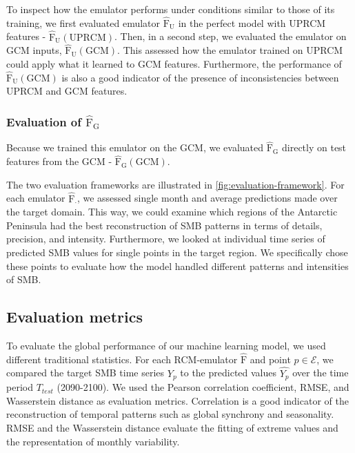 \documentclass[a4paper,11pt,oneside]{report}
\begin{document}
To inspect how the emulator performs under conditions similar to those of its training, we first evaluated emulator $\mathrm{\hat{F}_U}$ in the perfect model with UPRCM features - $\mathrm{\hat{F}_U(UPRCM)}$. Then, in a second step, we evaluated the emulator on GCM inputs, $\mathrm{\hat{F}_U(GCM)}$. This assessed how the emulator trained on UPRCM could apply what it learned to GCM features. Furthermore, the performance of $\mathrm{\hat{F}_U(GCM)}$ is also a good indicator of the presence of inconsistencies between UPRCM and GCM features. 

\subsubsection{Evaluation of $\mathrm{\hat{F}_G}$}
 Because we trained this emulator on the GCM, we evaluated $\mathrm{\hat{F}_G}$ directly on test features from the GCM - $\mathrm{\hat{F}_G(GCM)}$.

The two evaluation frameworks are illustrated in \autoref{fig:evaluation-framework}. For each emulator $\mathrm{\hat{F}_{\cdot}}$, we assessed single month and average predictions made over the target domain. This way, we could examine which regions of the Antarctic Peninsula had the best reconstruction of SMB patterns in terms of details, precision, and intensity. Furthermore, we looked at individual time series of predicted SMB values for single points in the target region. We specifically chose these points to evaluate how the model handled different patterns and intensities of SMB.  

\subsection{Evaluation metrics}\label{subsec:evaluation-metrics} 

To evaluate the global performance of our machine learning model, we used different traditional statistics. For each RCM-emulator $\mathrm{\hat{F}}$ and point $p \in \mathcal{E}$, we compared the target SMB time series $Y_{p}$ to the predicted values $\widehat{Y_{p}}$ over the time period $T_{test}$ (2090-2100). We used the Pearson correlation coefficient, RMSE, and Wasserstein distance as evaluation metrics. Correlation is a good indicator of the reconstruction of temporal patterns such as global synchrony and seasonality. RMSE and the Wasserstein distance evaluate the fitting of extreme values and the representation of monthly variability. 
\end{document}
